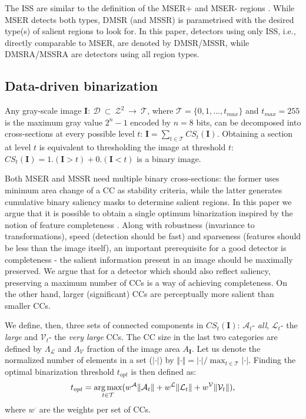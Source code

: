 \documentclass[conference,compsoc]{IEEEtran}
\def\I{{\mathbf I}}
\def\mcT{{\mathcal{T}}}
\def\mcD{{\mathcal{D}}}
\def\mcA{{\mathcal{A}}}
\def\mcL{{\mathcal{L}}}
\def\mcV{{\mathcal{V}}}
\DeclareMathOperator*{\argmax}{arg\,max}
\begin{document}
The ISS are similar to the definition of the MSER+ and MSER- regions \cite{Matas2002BMVC}. While MSER detects both types, DMSR (and MSSR) is parametrised with the desired type(s) of salient regions to look for. In this paper, detectors using only ISS, i.e., directly comparable to MSER, are denoted by DMSR/MSSR, while DMSRA/MSSRA are detectors using all region types.

\subsection{Data-driven binarization}
\label{ssec:binarize}
Any gray-scale image  $\I:~\mcD~\subset~\mathcal{Z}^2~\rightarrow ~\mcT $, where $\mcT=\{0,1,\ldots, t_{max}\}$ and $t_{max}=255$ is the maximum gray value $2^n-1$ encoded by $n=8$ bits, can be decomposed into cross-sections at
every possible level $t$:  $\I = \sum_{t \in \mcT}CS_t(\I)$. Obtaining a section at level $t$ is equivalent to thresholding the image at threshold $t$: $CS_t(\I)= 1.(\I>t) + 0.(\I<t)$ is a binary image. 

Both MSER and MSSR need multiple binary cross-sections: the former uses minimum area change of a CC as stability criteria, while the latter generates cumulative binary saliency masks to determine salient regions. In this paper we argue that it is possible to obtain a single optimum binarization inspired by the notion of feature completeness \cite{Dickscheid2011}. Along with robustness (invariance to transformations), speed (detection should be fast) and sparseness (features should be less than the image itself), an important prerequisite for a good detector is completeness - the salient information present in an image should be maximally preserved. We argue that for a detector which should also reflect saliency, preserving a maximum number of CCs is a way of achieving completeness. On the other hand, larger (significant) CCs are perceptually more salient than smaller CCs. 

We define, then, three sets of connected components in $CS_t(\I)$: $\mcA_t$- {\em all}, $\mcL_t$- the {\em large} and $\mcV_t$- the {\em very large} CCs.  The CC size in the last two categories are defined by $\Lambda_{\mcL}$ and $\Lambda_{\mcV}$ fraction of the image area $A_{\I}$. Let us denote the normalized number of elements in a set ($|\cdot|$) by $\Vert \cdot \Vert = |\cdot| / \max_{t \in \mcT}|\cdot|$.
Finding the optimal binarization threshold $t_{opt}$ is then defined as:
\begin{equation} \label{eq:bin}
\vspace{-0.05cm}
t_{opt} = \argmax_{t \in \mcT}( w^{\mcA} \Vert \mcA_t \Vert + w^{\mcL} \Vert \mcL_t \Vert + w^{\mcV} \Vert \mcV_t \Vert ),
\vspace{-0.05cm}
\end{equation}
where $w^{\cdot}$ are the weights per set of CCs.  
\end{document}

